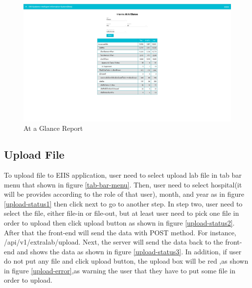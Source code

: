 	
    \FloatBarrier
    	\begin{figure}[h!]
            \centering
        		\includegraphics[width=12cm]{images/chapter-05/at-a-glance-report.png}
        		\caption{At a Glance Report}
        		\label{at-a-glance-report}
        \end{figure}
	\FloatBarrier
	

	
	\subsection{Upload File} \label{upload_file}
	To upload file to EIIS application, user need to select upload lab file in tab bar menu that shown in figure \ref{tab-bar-menu}. Then, user need to select hospital(it will be provides according to the role of that user), month, and year as in figure \ref{upload-status1} then click next to go to another step. In step two, user need to select the file, either file-in or file-out, but at least user need to pick one file in order to upload then click upload button as shown in figure \ref{upload-status2}. After that the front-end will send the data with POST method. For instance, /api/v1/extralab/upload. Next, the server will send the data back to the front-end and shows the data as shown in figure \ref{upload-status3}. In addition, if user do not put any file and click upload button, the upload box will be red ,as shown in figure \ref{upload-error},as warning the user that they have to put some file in order to upload.
   	
